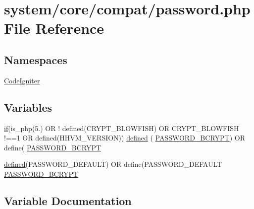\hypertarget{password_8php}{}\section{system/core/compat/password.php File Reference}
\label{password_8php}
\subsection*{Namespaces}
\begin{DoxyCompactItemize}
\item 
 \mbox{\hyperlink{namespace_code_igniter}{Code\+Igniter}}
\end{DoxyCompactItemize}
\subsection*{Variables}
\begin{DoxyCompactItemize}
\item 
\mbox{\hyperlink{_code_igniter_8php_a565ae1002e1468af84434f86276c519e}{if}}(is\+\_\+php(\textquotesingle{}5.\textquotesingle{}) OR ! defined(\textquotesingle{}C\+R\+Y\+P\+T\+\_\+\+B\+L\+O\+W\+F\+I\+SH\textquotesingle{}) OR C\+R\+Y\+P\+T\+\_\+\+B\+L\+O\+W\+F\+I\+SH !==1 OR defined(\textquotesingle{}H\+H\+V\+M\+\_\+\+V\+E\+R\+S\+I\+ON\textquotesingle{})) \mbox{\hyperlink{password_8php_a74f41c0efe4435fb8ac2133464d3cd57}{defined}} ( \textquotesingle{}\mbox{\hyperlink{password_8php_a68891a3748e6362ed60dd2dc90d37576}{P\+A\+S\+S\+W\+O\+R\+D\+\_\+\+B\+C\+R\+Y\+PT}}\textquotesingle{}) OR define( \textquotesingle{}\mbox{\hyperlink{password_8php_a68891a3748e6362ed60dd2dc90d37576}{P\+A\+S\+S\+W\+O\+R\+D\+\_\+\+B\+C\+R\+Y\+PT}}\textquotesingle{}
\item 
\mbox{\hyperlink{password_8php_a74f41c0efe4435fb8ac2133464d3cd57}{defined}}(\textquotesingle{}P\+A\+S\+S\+W\+O\+R\+D\+\_\+\+D\+E\+F\+A\+U\+LT\textquotesingle{}) OR define(\textquotesingle{}P\+A\+S\+S\+W\+O\+R\+D\+\_\+\+D\+E\+F\+A\+U\+LT\textquotesingle{} \mbox{\hyperlink{password_8php_a68891a3748e6362ed60dd2dc90d37576}{P\+A\+S\+S\+W\+O\+R\+D\+\_\+\+B\+C\+R\+Y\+PT}}
\end{DoxyCompactItemize}


\subsection{Variable Documentation}
\mbox{\label{password_8php_a74f41c0efe4435fb8ac2133464d3cd57}} 
